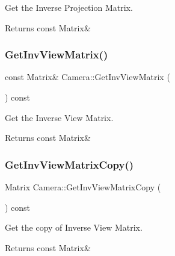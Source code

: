 Get the Inverse Projection Matrix. 

\begin{DoxyReturn}{Returns}
const Matrix\& 
\end{DoxyReturn}
\mbox{\label{classCamera_a7af480f3ec57bf981cd00b202aa0ff13}} 
\subsubsection{\texorpdfstring{Get\+Inv\+View\+Matrix()}{GetInvViewMatrix()}}
{\footnotesize\ttfamily const Matrix\& Camera\+::\+Get\+Inv\+View\+Matrix (\begin{DoxyParamCaption}{ }\end{DoxyParamCaption}) const\hspace{0.3cm}{\ttfamily [inline]}}



Get the Inverse View Matrix. 

\begin{DoxyReturn}{Returns}
const Matrix\& 
\end{DoxyReturn}
\mbox{\label{classCamera_ad9cd52470afe2f8a0e7a651f4592ee3c}} 
\subsubsection{\texorpdfstring{Get\+Inv\+View\+Matrix\+Copy()}{GetInvViewMatrixCopy()}}
{\footnotesize\ttfamily Matrix Camera\+::\+Get\+Inv\+View\+Matrix\+Copy (\begin{DoxyParamCaption}{ }\end{DoxyParamCaption}) const\hspace{0.3cm}{\ttfamily [inline]}}



Get the copy of Inverse View Matrix. 

\begin{DoxyReturn}{Returns}
const Matrix\& 
\end{DoxyReturn}
\mbox{\label{classCamera_a00cfc3d1d31e179df4d02b3878da75bd}} 
